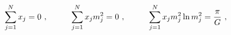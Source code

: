 \begin{equation}\label{b.1}
\sum_{j=1}^{N}x_j=0~,\hskip 1cm
\sum_{j=1}^{N}x_jm_j^2=0~,\hskip 1cm
\sum_{j=1}^{N}x_j m_j^2\ln m_j^2={\pi \over G}~,
\end{equation}

